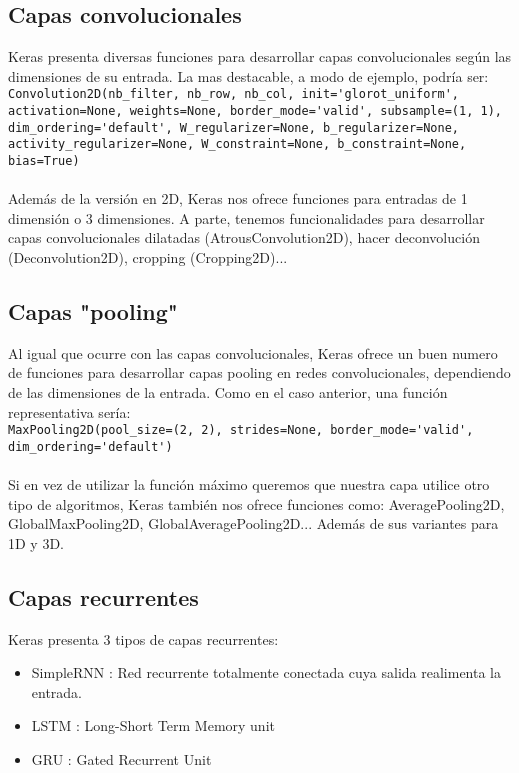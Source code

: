 \subsection{Capas convolucionales}
Keras presenta diversas funciones para desarrollar capas convolucionales según las dimensiones de su entrada. La mas destacable, a modo de ejemplo, podría ser:\\
\lstinline{Convolution2D(nb_filter, nb_row, nb_col, init='glorot_uniform', activation=None, weights=None, border_mode='valid', subsample=(1, 1), dim_ordering='default', W_regularizer=None, b_regularizer=None, activity_regularizer=None, W_constraint=None, b_constraint=None, bias=True)}\\\\
Además de la versión en 2D, Keras nos ofrece funciones para entradas de 1 dimensión o 3 dimensiones. A parte, tenemos funcionalidades para desarrollar capas convolucionales dilatadas (AtrousConvolution2D), hacer deconvolución (Deconvolution2D), cropping (Cropping2D)...
\subsection{Capas "pooling"}
Al igual que ocurre con las capas convolucionales, Keras ofrece un buen numero de funciones para desarrollar capas pooling en redes convolucionales, dependiendo de las dimensiones de la entrada. Como en el caso anterior, una función representativa sería:\\
\lstinline{MaxPooling2D(pool_size=(2, 2), strides=None, border_mode='valid', dim_ordering='default')}\\\\
Si en vez de utilizar la función máximo queremos que nuestra capa utilice otro tipo de algoritmos, Keras también nos ofrece funciones como: AveragePooling2D, GlobalMaxPooling2D, GlobalAveragePooling2D... Además de sus variantes para 1D y 3D.
\subsection{Capas recurrentes}
Keras presenta 3 tipos de capas recurrentes:
\begin{itemize}[noitemsep]
\item SimpleRNN : Red recurrente totalmente conectada cuya salida realimenta la entrada.
\item LSTM : Long-Short Term Memory unit
\item GRU : Gated Recurrent Unit
\end{itemize}

